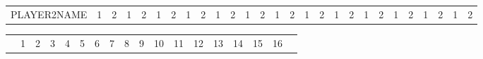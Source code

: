 \begin{table}
\begin{tabular}{p{5cm}|c|c|c|c|c|c|c|c|c|c|c|c|c|c|c|c|c|c|c|c|c|c|c|c|c|c|}
\cline{1-27}
\cline{1-27}
PLAYER2NAME & \footnotesize 1 & \footnotesize 2 & \footnotesize 1 & \footnotesize 2 & \footnotesize 1 & \footnotesize 2 & \footnotesize 1 & \footnotesize 2 & \footnotesize 1 & \footnotesize 2 & \footnotesize 1 & \footnotesize 2 & \footnotesize 1 & \footnotesize 2 & \footnotesize 1 & \footnotesize 2 & \footnotesize 1 & \footnotesize 2 & \footnotesize 1 & \footnotesize 2 & \footnotesize 1 & \footnotesize 2 & \footnotesize 1 & \footnotesize 2 & \footnotesize 1 & \footnotesize 2 \\
\cline{2-27}
\end{tabular}
\begin{tabular}{p{5cm}|c|c|c|c|c|c!{\vrule width 2pt}c|c|c|c|c|c|c|c|c|c!{\vrule width 3pt}p{1cm}!{\vrule width 3pt}}
& 1 & 2 & 3 & 4 & 5 & 6 & 7 & 8 & 9 & 10 & 11 & 12 & 13 & 14 & 15 & 16 & \\
\end{tabular}
\end{table}

